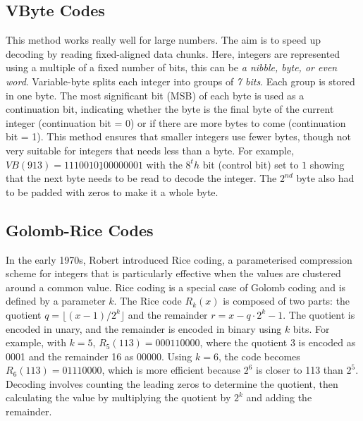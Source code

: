 \subsection{VByte Codes }
This method works really well for large numbers. The aim is to speed up decoding by reading fixed-aligned data chunks. Here, integers are represented using a multiple of a fixed number of bits, this can be \textit{a nibble, byte, or even word}. Variable-byte \cite{Thiel_1972} splits each integer into groups of \textit{7 bits}. Each group is stored in one byte. The most significant bit (MSB) of each byte is used as a continuation bit, indicating whether the byte is the final byte of the current integer (continuation bit = 0) or if there are more bytes to come (continuation bit = 1). This method ensures that smaller integers use fewer bytes, though not very suitable for integers that needs less than a byte. For example, $VB(913) = 1110010\underline{1}00000001$ with the $8^th$ bit (control bit) set to $1$ showing that the next byte needs to be read to decode the integer. The $2^{nd}$ byte also had to be padded with zeros to make it a whole byte.

\subsection{Golomb-Rice Codes}
In the early 1970s, Robert \cite{Rice_1971} introduced Rice coding, a parameterised compression scheme for integers that is particularly effective when the values are clustered around a common value. Rice coding is a special case of Golomb coding and is defined by a parameter \( k \). The Rice code \( R_k(x) \) is composed of two parts: the quotient \( q = \lfloor (x-1)/2^k \rfloor \) and the remainder \( r = x - q \cdot 2^k - 1 \). The quotient is encoded in unary, and the remainder is encoded in binary using \( k \) bits. For example, with \( k = 5 \), \( R_5(113) = 000110000 \), where the quotient 3 is encoded as 0001 and the remainder 16 as 00000. Using \( k = 6 \), the code becomes \( R_6(113) = 01110000 \), which is more efficient because \( 2^6 \) is closer to 113 than \( 2^5 \). Decoding involves counting the leading zeros to determine the quotient, then calculating the value by multiplying the quotient by \( 2^k \) and adding the remainder.

